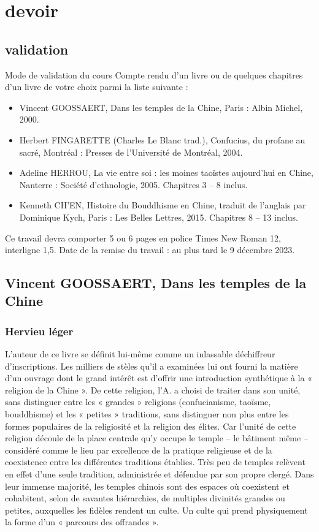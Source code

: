 \chapter{devoir}


\section{validation}
Mode de validation du cours   Compte rendu d’un livre ou de quelques chapitres d’un livre de votre choix parmi la liste suivante :  
\begin{itemize}

\item  Vincent GOOSSAERT, Dans les temples de la Chine, Paris : Albin Michel, 2000.  
\item  Herbert FINGARETTE (Charles Le Blanc trad.), Confucius, du profane au sacré, Montréal : Presses de l’Université de Montréal, 2004.  
\item  Adeline HERROU, La vie entre soi : les moines taoïstes aujourd’hui en Chine, Nanterre : Société d’ethnologie, 2005. Chapitres 3 – 8 inclus.  
\item  Kenneth CH’EN, Histoire du Bouddhisme en Chine, traduit de l’anglais par Dominique Kych, Paris : Les Belles Lettres, 2015. Chapitres 8 – 13 inclus.   

\end{itemize}

Ce travail devra comporter 5 ou 6 pages en police Times New Roman 12, interligne 1,5.   Date de la remise du travail : au plus tard le 9 décembre 2023. 

\section{Vincent GOOSSAERT, Dans les temples de la Chine}

\subsection{Hervieu léger}

L’auteur de ce livre se définit lui-même comme un inlassable déchiffreur d’inscriptions. Les milliers de stèles qu’il a examinées lui ont fourni la matière d’un ouvrage dont le grand intérêt est d’offrir une introduction synthétique à la « religion de la Chine ». De cette religion, l’A. a choisi de traiter dans son unité, sans distinguer entre les « grandes » religions (confucianisme, taoïsme, bouddhisme) et les « petites » traditions, sans distinguer non plus entre les formes populaires de la religiosité et la religion des élites. Car l’unité de cette religion découle de la place centrale qu’y occupe le temple – le bâtiment même – considéré comme le lieu par excellence de la pratique religieuse et de la coexistence entre les différentes traditions établies. Très peu de temples relèvent en effet d’une seule tradition, administrée et défendue par son propre clergé. Dans leur immense majorité, les temples chinois sont des espaces où coexistent et cohabitent, selon de savantes hiérarchies, de multiples divinités grandes ou petites, auxquelles les fidèles rendent un culte. Un culte qui prend physiquement la forme d’un « parcours des offrandes ».

